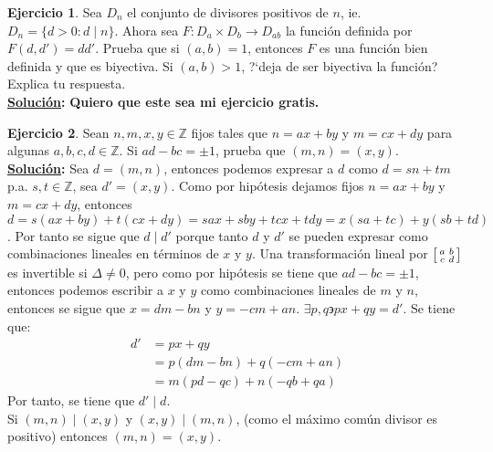 \documentclass[11pt,letterpaper]{article}
\theoremstyle{definition}\newtheorem{p}{Ejercicio}
\theoremstyle{definition}\newtheorem{pp}[p]{$(*)$Ejercicio}
\numberwithin{p}{section}
\newcommand{\Z}{\mathbb{Z}}
\newcommand{\ra}{\rightarrow}
\newcommand{\sol}{\textbf{\underline{Solución}: }} %
\begin{document}
%
\begin{p}
  Sea $D_n$ el conjunto de divisores positivos de $n$, ie. $D_n=\{d>0 : d\mid n\}$. Ahora sea
  $F:D_a\times D_b\ra D_{ab}$ la funci\'on definida por $F(d,d')=dd'$. Prueba que si $(a,b)=1$, entonces $F$ es
  una funci\'on bien definida y que es biyectiva. Si $(a,b)>1$, ?`deja de ser biyectiva la funci\'on? Explica tu
  respuesta.\\
  \sol \textbf{Quiero que este sea mi ejercicio gratis.}
\end{p}
%
\begin{p}
  Sean $n,m,x,y\in\Z$ fijos tales que $n=ax+by$ y $m=cx+dy$ para algunas $a,b,c,d\in\Z$. Si $ad-bc=\pm 1$, prueba
  que $(m,n)=(x,y)$.\\
  \sol Sea $d=(m,n)$, entonces podemos expresar a $d$ como $d=sn+tm$ p.a. $s,t \in \Z$, sea 
  $d'=(x,y)$. Como por hipótesis  dejamos fijos $n=ax+by$ y $m=cx+dy$, entonces 
  $d=s(ax+by)+t(cx+dy)=sax+sby+tcx+tdy=x(sa+tc)+y(sb+td)$. Por tanto se sigue que $d \mid d'$ 
  porque tanto $d$ y $d'$ se pueden expresar como combinaciones lineales en términos de $x$ y $y$.
  Una transformación lineal por $\begin{bsmallmatrix}a&b\\c&d\end{bsmallmatrix}$
  es invertible si $\Delta \neq 0$, pero como por hipótesis se tiene que $ad-bc=\pm 1$, entonces 
  podemos escribir a $x$ y $y$ como combinaciones lineales de $m$ y $n$, entonces se sigue que 
  $x=dm-bn$ y $y=-cm+an$. $\exists p, q \backepsilon px + qy = d'$.
  Se tiene que:
  \begin{align*}
  d'
    &= px + qy \\
    &= p(dm-bn) + q(-cm+an) \\
    &= m(pd-qc) + n(-qb+qa)
  \end{align*}
  Por tanto, se tiene que $d' \mid d$.\\
  Si $(m,n) \mid (x, y)$ y $(x, y) \mid (m,n)$, (como el máximo común divisor es positivo) 
  entonces $(m,n)=(x,y)$.
\end{p}
%
\end{document}
